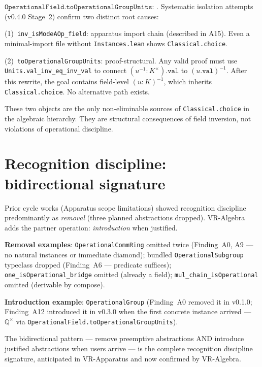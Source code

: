 \begin{remark}
\label{rem:A16}
\leanok
{}
$\texttt{OperationalField.toOperationalGroupUnits}$:
.
Systematic isolation attempts (v0.4.0 Stage~2) confirm two distinct
root causes:

(1)~\texttt{inv\_isModeAOp\_field}: apparatus import chain (described
in A15).  Even a minimal-import file without \texttt{Instances.lean}
shows \texttt{Classical.choice}.

(2)~\texttt{toOperationalGroupUnits}: proof-structural.  Any valid proof
must use \texttt{Units.val\_inv\_eq\_inv\_val} to connect
$(u^{-1} : K^\times).\texttt{val}$ to $(u.\texttt{val})^{-1}$.
After this rewrite, the goal contains field-level $(u : K)^{-1}$,
which inherits \texttt{Classical.choice}.  No alternative path exists.

These two objects are the only non-eliminable sources of
\texttt{Classical.choice} in the algebraic hierarchy.  They are
structural consequences of field inversion, not violations of
operational discipline.
\end{remark}

\section{Recognition discipline: bidirectional signature}
\label{sec:algebra_recognition}

\begin{remark}
\label{rem:recognition_bidirectional}
\leanok
{}
Prior cycle works (Apparatus scope limitations) showed recognition
discipline predominantly as \emph{removal} (three planned abstractions
dropped).  VR-Algebra adds the partner operation: \emph{introduction}
when justified.

\textbf{Removal examples}: \texttt{OperationalCommRing} omitted twice
(Finding~A0, A9 --- no natural instances or immediate diamond); bundled
\texttt{OperationalSubgroup} typeclass dropped (Finding~A6 --- predicate
suffices); \texttt{one\_isOperational\_bridge} omitted (already a field);
\texttt{mul\_chain\_isOperational} omitted (derivable by compose).

\textbf{Introduction example}: \texttt{OperationalGroup} (Finding~A0
removed it in v0.1.0; Finding~A12 introduced it in v0.3.0 when the
first concrete instance arrived --- $\mathbb{Q}^\times$ via
\texttt{OperationalField.toOperationalGroupUnits}).

The bidirectional pattern --- remove preemptive abstractions AND
introduce justified abstractions when users arrive --- is the complete
recognition discipline signature, anticipated in VR-Apparatus and now
confirmed by VR-Algebra.
\end{remark}

